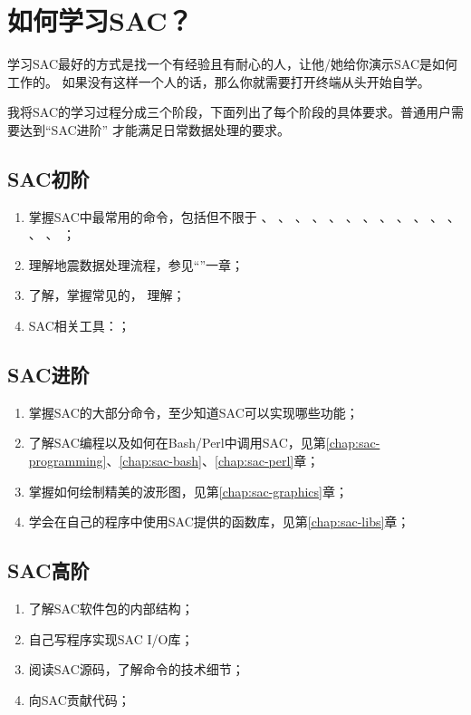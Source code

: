 \section{如何学习SAC？}
学习SAC最好的方式是找一个有经验且有耐心的人，让他/她给你演示SAC是如何工作的。
如果没有这样一个人的话，那么你就需要打开终端从头开始自学。

我将SAC的学习过程分成三个阶段，下面列出了每个阶段的具体要求。普通用户需要达到``SAC进阶''
才能满足日常数据处理的要求。

\subsection*{SAC初阶}
\begin{enumerate}
    \item 掌握SAC中最常用的命令，包括但不限于
            、
            、
            、
            、
            、
            、
            、
            、
            、
            、
            、
            、
            、
            、
            ；
        \item 理解地震数据处理流程，参见``''一章；
        \item 了解，掌握常见的，
            理解；
        \item SAC相关工具：；
\end{enumerate}

\subsection*{SAC进阶}
\begin{enumerate}
\item 掌握SAC的大部分命令，至少知道SAC可以实现哪些功能；
\item 了解SAC编程以及如何在Bash/Perl中调用SAC，见第\ref{chap:sac-programming}、\ref{chap:sac-bash}、\ref{chap:sac-perl}章；
\item 掌握如何绘制精美的波形图，见第\ref{chap:sac-graphics}章；
\item 学会在自己的程序中使用SAC提供的函数库，见第\ref{chap:sac-libs}章；
\end{enumerate}

\subsection*{SAC高阶}
\begin{enumerate}
\item 了解SAC软件包的内部结构；
\item 自己写程序实现SAC I/O库；
\item 阅读SAC源码，了解命令的技术细节；
\item 向SAC贡献代码；
\end{enumerate}
